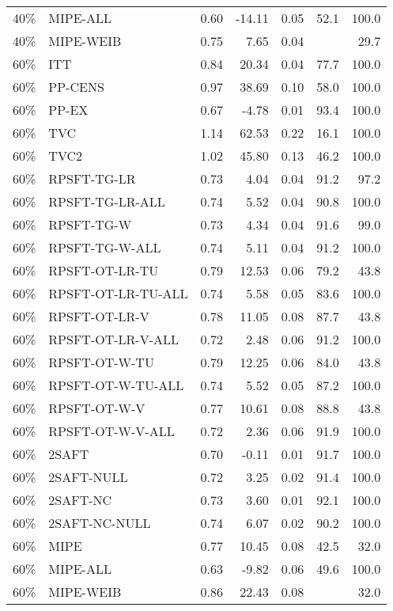 \begin{table}[ht]
{\begin{tabular}{llrrrrr}
  40\% & MIPE-ALL & 0.60 & -14.11 & 0.05 & 52.1 & 100.0 \\ 
  40\% & MIPE-WEIB & 0.75 & 7.65 & 0.04 &  & 29.7 \\ 
   \hline
60\% & ITT & 0.84 & 20.34 & 0.04 & 77.7 & 100.0 \\ 
  60\% & PP-CENS & 0.97 & 38.69 & 0.10 & 58.0 & 100.0 \\ 
  60\% & PP-EX & 0.67 & -4.78 & 0.01 & 93.4 & 100.0 \\ 
  60\% & TVC & 1.14 & 62.53 & 0.22 & 16.1 & 100.0 \\ 
  60\% & TVC2 & 1.02 & 45.80 & 0.13 & 46.2 & 100.0 \\ 
   \hline
60\% & RPSFT-TG-LR & 0.73 & 4.04 & 0.04 & 91.2 & 97.2 \\ 
  60\% & RPSFT-TG-LR-ALL & 0.74 & 5.52 & 0.04 & 90.8 & 100.0 \\ 
  60\% & RPSFT-TG-W & 0.73 & 4.34 & 0.04 & 91.6 & 99.0 \\ 
  60\% & RPSFT-TG-W-ALL & 0.74 & 5.11 & 0.04 & 91.2 & 100.0 \\ 
  60\% & RPSFT-OT-LR-TU & 0.79 & 12.53 & 0.06 & 79.2 & 43.8 \\ 
  60\% & RPSFT-OT-LR-TU-ALL & 0.74 & 5.58 & 0.05 & 83.6 & 100.0 \\ 
  60\% & RPSFT-OT-LR-V & 0.78 & 11.05 & 0.08 & 87.7 & 43.8 \\ 
  60\% & RPSFT-OT-LR-V-ALL & 0.72 & 2.48 & 0.06 & 91.2 & 100.0 \\ 
   \hline
60\% & RPSFT-OT-W-TU & 0.79 & 12.25 & 0.06 & 84.0 & 43.8 \\ 
  60\% & RPSFT-OT-W-TU-ALL & 0.74 & 5.52 & 0.05 & 87.2 & 100.0 \\ 
  60\% & RPSFT-OT-W-V & 0.77 & 10.61 & 0.08 & 88.8 & 43.8 \\ 
  60\% & RPSFT-OT-W-V-ALL & 0.72 & 2.36 & 0.06 & 91.9 & 100.0 \\ 
   \hline
60\% & 2SAFT & 0.70 & -0.11 & 0.01 & 91.7 & 100.0 \\ 
  60\% & 2SAFT-NULL & 0.72 & 3.25 & 0.02 & 91.4 & 100.0 \\ 
  60\% & 2SAFT-NC & 0.73 & 3.60 & 0.01 & 92.1 & 100.0 \\ 
  60\% & 2SAFT-NC-NULL & 0.74 & 6.07 & 0.02 & 90.2 & 100.0 \\ 
  60\% & MIPE & 0.77 & 10.45 & 0.08 & 42.5 & 32.0 \\ 
  60\% & MIPE-ALL & 0.63 & -9.82 & 0.06 & 49.6 & 100.0 \\ 
  60\% & MIPE-WEIB & 0.86 & 22.43 & 0.08 &  & 32.0 \\ 
   \hline
\end{tabular}
}
\end{table}
